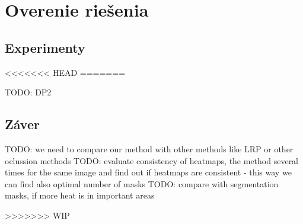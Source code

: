 \chapter{Overenie riešenia}

\section{Experimenty}
<<<<<<< HEAD
=======

TODO: DP2


\section{Záver}

TODO: we need to compare our method with other methods like LRP or other oclussion methods
TODO: evaluate consistency of heatmaps, the method several times for the same image and find out if heatmaps are consistent - this way we can find also optimal number of masks
TODO: compare with segmentation masks, if more heat is in important areas

>>>>>>> WIP
